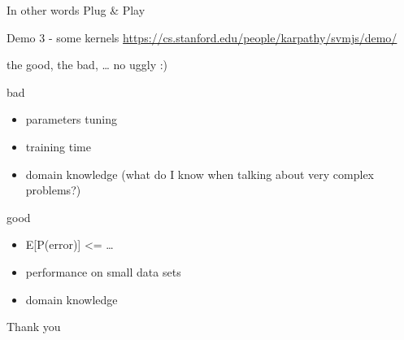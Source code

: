 \documentclass[bigger]{beamer}
\begin{document}
\begin{frame}[label=sec-1-21]{In other words}
Plug \& Play
\end{frame}

\begin{frame}[label=sec-1-22]{Demo 3 - some kernels}
\url{https://cs.stanford.edu/people/karpathy/svmjs/demo/}
\end{frame}

\begin{frame}[label=sec-1-23]{the good, the bad, \ldots{}}
no uggly :)

bad
\begin{itemize}
\item parameters tuning
\item training time
\item domain knowledge (what do I know when talking about very complex problems?)
\end{itemize}


good
\begin{itemize}
\item E[P(error)] <= \ldots{}
\item performance on small data sets
\item domain knowledge
\end{itemize}
\end{frame}

\begin{frame}[label=sec-1-24]{Thank you}
\end{frame}
\end{document}
